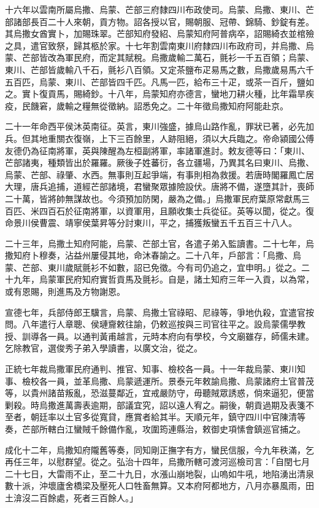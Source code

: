 \begin{pinyinscope}
十六年以雲南所屬烏撒、烏蒙、芒部三府隸四川布政使司。烏蒙、烏撒、東川、芒部諸部長百二十人來朝，貢方物。詔各授以官，賜朝服、冠帶、錦騎、鈔錠有差。其烏撒女酋實卜，加賜珠翠。芒部知府發紹、烏蒙知府阿普病卒，詔賜綺衣並棺殮之具，遣官致祭，歸其柩於家。十七年割雲南東川府隸四川布政府司，并烏撒、烏蒙、芒部皆改為軍民府，而定其賦稅。烏撒歲輸二萬石，氈衫一千五百領；烏蒙、東川、芒部皆歲輸八千石，氈衫八百領。又定茶鹽布疋易馬之數，烏撒歲易馬六千五百匹，烏蒙、東川、芒部皆四千匹。凡馬一匹，給布三十疋，或茶一百斤，鹽如之。實卜復貢馬，賜綺鈔。十八年，烏蒙知府亦德言，蠻地刀耕火種，比年霜旱疾疫，民饑窘，歲輸之糧無從徵納。詔悉免之。二十年徵烏撒知府阿能赴京。

二十一年命西平侯沐英南征。英言，東川強盛，據烏山路作亂，罪狀已著，必先加兵。但其地重關衣復嶺，上下三百餘里，人跡阻絕，須以大兵臨之。帝命潁國公傅友德仍為征南將軍，英與陳醒為左桓副將軍，率諸軍進討。敕友德等曰：「東川、芒部諸夷，種類皆出於羅羅。厥後子姓蕃衍，各立疆場，乃異其名曰東川、烏撒、烏蒙、芒部、祿肇、水西。無事則互起爭端，有事則相為救援。若唐時閣羅鳳亡居大理，唐兵追捕，道經芒部諸境，君蠻聚眾據險設伏。唐將不備，遂墮其計，喪師二十萬，皆將帥無謀故也。今須預加防閑，嚴為之備。」烏撒軍民府葉原常獻馬三百匹、米四百石於征南將軍，以資軍用，且願收集士兵從征。英等以聞，從之。復命景川侯曹震、靖寧侯葉昇等分討東川，平之，捕獲叛蠻五千五百三十八人。

二十三年，烏撒土知府阿能，烏蒙、芒部土官，各遣子弟入監讀書。二十七年，烏撒知府卜穆奏，沾益州屢侵其地，命沐春諭之。二十八年，戶部言：「烏撒、烏蒙、芒部、東川歲賦氈衫不如數，詔已免徵。今有司仍追之，宜申明。」從之。二十九年，烏蒙軍民府知府實哲貢馬及氈衫。自是，諸土知府三年一入貢，以為常，或有恩賜，則進馬及方物謝恩。

宣德七年，兵部侍郎王驥言，烏蒙、烏撒土官祿昭、尼祿等，爭地仇殺，宜遣官按問。八年遣行人章聰、侯璉齎敕往諭，仍敕巡按與三司官往平之。設烏蒙儒學教授、訓導各一員。以通判黃甫越言，元時本府向有學校，今文廟雖存，師儒未建。乞除教官，選俊秀子弟入學讀書，以廣文治，從之。

正統七年裁烏撒軍民府通判、推官、知事、檢校各一員。十一年裁烏蒙、東川知事、檢校各一員，並革烏撒、烏蒙遞運所。景泰元年敕諭烏撒、烏蒙諸府土官普茂等，以貴州諸苗叛亂，恐滋蔓鄰近，宜戒嚴防守，毋聽賊眾誘惑，倘來逼犯，便當剿殺。時烏撒進萬壽表逾期，部議宜究，詔以遠人宥之。嗣後，朝貢過期及表箋不至者，朝廷率以土官多從寬貸，應賞者給其半。天順元年，鎮守四川中官陳清等奏，芒部所轄白江蠻賊千餘備作亂，攻圍筠連縣治，敕御史項愫會鎮巡官捕之。

成化十二年，烏撒知府隴舊等奏，同知剛正撫字有方，蠻民信服，今九年秩滿，乞再任三年，以慰群望。從之。弘治十四年，烏撒所轄可渡河巡檢司言：「自閏七月二十七日，大雷雨不止，至二十九日，水漲山崩地裂，山嗚如牛吼，地陷湧出清泉數十派，沖壞廬舍橋梁及壓死人口牲畜無算。又本府阿都地方，八月亦暴風雨，田土渰沒二百餘處，死者三百餘人。」


\end{pinyinscope}
